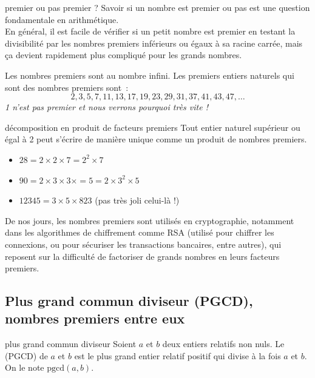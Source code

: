 \begin{enumeratebf}
\begin{remarque}{}{premier ou pas premier ?}
    Savoir si un nombre est premier ou pas est une question fondamentale en arithmétique. \\
    En général, il est facile de vérifier si un petit nombre est premier en testant la divisibilité par les nombres premiers inférieurs ou égaux à sa racine carrée, mais ça devient rapidement plus compliqué pour les grands nombres.
\end{remarque}

\begin{remarque}{}{}
    Les nombres premiers sont au nombre infini. Les premiers entiers naturels qui sont des nombres premiers sont~:
    \[2, 3, 5, 7, 11, 13, 17, 19, 23, 29, 31, 37, 41, 43, 47, \dots\]
    \textit{1 n'est pas premier et nous verrons pourquoi très vite !}
\end{remarque}

\begin{theoreme}{}{décomposition en produit de facteurs premiers}
    Tout entier naturel supérieur ou égal à 2 peut s'écrire de manière unique comme un produit de nombres premiers.
\end{theoreme}

\begin{exemple}{}{}
    \begin{itemize}
        \item $28 = 2 \times 2 \times 7 = 2^2 \times 7$
        \item $90 = 2 \times 3 \times 3 \times = 5 = 2 \times 3^2 \times 5$
        \item $12345 = 3 \times 5 \times 823$ (pas très joli celui-là !)
    \end{itemize}
\end{exemple}

De nos jours, les nombres premiers sont utilisés en cryptographie, notamment dans les algorithmes de chiffrement comme RSA (utilisé pour chiffrer les connexions, ou pour sécuriser les transactions bancaires, entre autres), qui reposent sur la difficulté de factoriser de grands nombres en leurs facteurs premiers.

\subsection{Plus grand commun diviseur (PGCD), nombres premiers entre eux}

\begin{definition}{}{plus grand commun diviseur}
    Soient \(a\) et \(b\) deux entiers relatifs non nuls. Le  (PGCD) de \(a\) et \(b\) est le plus grand entier relatif positif qui divise à la fois \(a\) et \(b\). On le note \(\text{pgcd}(a, b)\).
\end{definition}


\end{enumeratebf}

